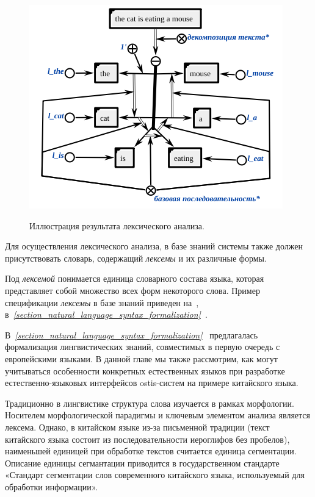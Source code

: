 \begin{figure}[H]
    \centering
    \caption{Иллюстрация результата лексического анализа.}
    \includegraphics[scale=0.8]{images/part4/chapter_nl_interfaces/lexical}
    \label{fig:lexical_result}
\end{figure}

Для осуществления лексического анализа, в базе знаний системы также должен присутствовать словарь, содержащий \textit{лексемы} и их различные формы.

Под \textit{лексемой} понимается единица словарного состава языка, которая представляет собой множество всех форм некоторого слова.
Пример спецификации \textit{лексемы} в базе знаний приведен на~\textit{}, в~\textit{\ref{section_natural_language_syntax_formalization}~}.

В~\textit{\ref{section_natural_language_syntax_formalization}~} предлагалась формализация лингвистических знаний, совместимых в первую очередь с европейскими языками.
В данной главе мы также рассмотрим, как могут учитываться особенности конкретных естественных языков при разработке естественно-языковых интерфейсов ostis-систем на примере китайского языка.

Традиционно в лингвистике структура слова изучается в рамках морфологии.
Носителем морфологической парадигмы и ключевым элементом анализа является лексема.
Однако, в китайском языке из-за письменной традиции (текст китайского языка состоит из последовательности иероглифов без пробелов), наименьшей единицей при обработке текстов считается единица сегментации.
Описание единицы сегмантации приводится в государственном стандарте «Стандарт сегментации слов современного китайского языка, используемый для обработки информации».
\begin{SCn}
\end{SCn}

